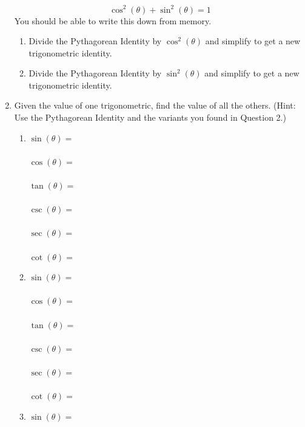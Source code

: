 \documentclass{article}
\begin{document}
\begin{enumerate}
  \[
    \cos^2(\theta) + \sin^2(\theta) = 1
  \]
  You should be able to write this down from memory.
  \begin{enumerate}
  \item Divide the Pythagorean Identity by $\cos^2(\theta)$ and simplify to get a new trigonometric identity.
    \vspace{1.5in}
  \item Divide the Pythagorean Identity by $\sin^2(\theta)$ and simplify to get a new trigonometric identity.
  \end{enumerate}
  \newpage
\item Given the value of one trigonometric, find the value of all the others. (Hint: Use the Pythagorean Identity and the variants you found in Question 2.)
  \begin{enumerate}
  \item 
    \begin{multicols}{2}
      $\sin(\theta) = $ \\ \\
      $\cos(\theta) = $ \\ \\
      $\tan(\theta) = $ \\ \\
      $\csc(\theta) = $ \\ \\
      $\sec(\theta) = $ \\ \\
      $\cot(\theta) = $
    \end{multicols}
    \vspace{1in}
  \item 
    \begin{multicols}{2}
      $\sin(\theta) = $ \\ \\
      $\cos(\theta) = $ \\ \\
      $\tan(\theta) = $ \\ \\
      $\csc(\theta) = $ \\ \\
      $\sec(\theta) = $ \\ \\
      $\cot(\theta) = $
    \end{multicols}
    \vspace{1in}
  \item 
    \begin{multicols}{2}
      $\sin(\theta) = $ \\ \\

\end{multicols}
\end{enumerate}
\end{enumerate}
\end{document}
